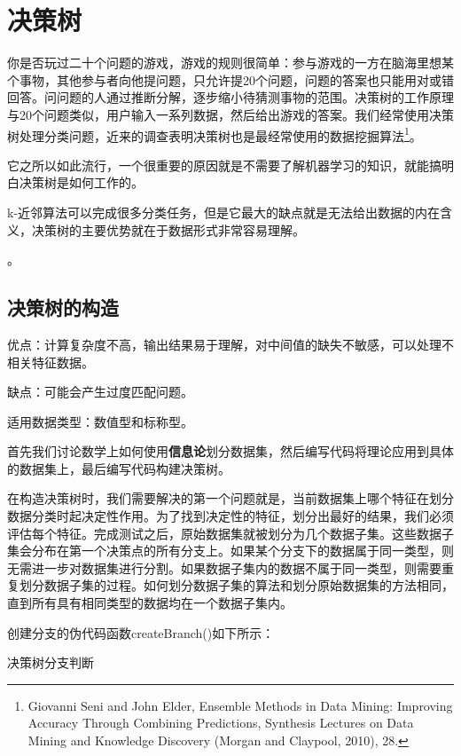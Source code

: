 \chapter{决策树}
你是否玩过二十个问题的游戏，游戏的规则很简单：参与游戏的一方在脑海里想某个事物，其他参与者向他提问题，只允许提20个问题，问题的答案也只能用对或错回答。问问题的人通过推断分解，逐步缩小待猜测事物的范围。决策树的工作原理与20个问题类似，用户输入一系列数据，然后给出游戏的答案。我们经常使用决策树处理分类问题，近来的调查表明决策树也是最经常使用的数据挖掘算法\footnote{Giovanni Seni and John Elder, Ensemble Methods in Data Mining: Improving Accuracy Through Combining Predictions, Synthesis Lectures on Data Mining and Knowledge Discovery (Morgan and Claypool, 2010), 28.}。

它之所以如此流行，一个很重要的原因就是不需要了解机器学习的知识，就能搞明白决策树是如何工作的。

k-近邻算法可以完成很多分类任务，但是它最大的缺点就是无法给出数据的内在含义，决策树的主要优势就在于数据形式非常容易理解。

。
\section{决策树的构造}
\begin{tcolorbox}[title=决策树]
    优点：计算复杂度不高，输出结果易于理解，对中间值的缺失不敏感，可以处理不相关特征数据。

    缺点：可能会产生过度匹配问题。

    适用数据类型：数值型和标称型。
\end{tcolorbox}

首先我们讨论数学上如何使用\textbf{信息论}划分数据集，然后编写代码将理论应用到具体的数据集上，最后编写代码构建决策树。

在构造决策树时，我们需要解决的第一个问题就是，当前数据集上哪个特征在划分数据分类时起决定性作用。为了找到决定性的特征，划分出最好的结果，我们必须评估每个特征。完成测试之后，原始数据集就被划分为几个数据子集。这些数据子集会分布在第一个决策点的所有分支上。如果某个分支下的数据属于同一类型，则无需进一步对数据集进行分割。如果数据子集内的数据不属于同一类型，则需要重复划分数据子集的过程。如何划分数据子集的算法和划分原始数据集的方法相同，直到所有具有相同类型的数据均在一个数据子集内。

创建分支的伪代码函数createBranch()如下所示：
\begin{algorithm}
    \caption{决策树分支判断}
\end{algorithm}